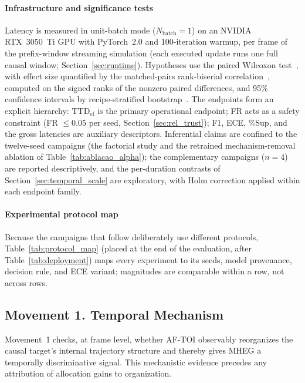\documentclass[a4paper,fleqn]{cas-dc}
\newcommand{\AFTOI}{\mbox{AF-TOI}\xspace}
\newcommand{\MHEG}{\mbox{MHEG}\xspace}
\begin{document}
\paragraph{Infrastructure and significance tests}
Latency is measured in unit-batch mode ($N_{\text{batch}}=1$) on an
NVIDIA RTX~3050~Ti GPU with PyTorch~2.0 and 100-iteration warmup{\color{\revcolor}, per frame of the prefix-window streaming simulation (each executed update runs one full causal window; Section~\ref{sec:runtime})}.
Hypotheses use the paired Wilcoxon test~\cite{wilcoxon1945}, with effect
size quantified by the {\color{\revcolor}matched-pairs rank-biserial
correlation~\cite{kerby2014simple}, computed on the signed ranks of the
nonzero paired differences,} and 95\%
confidence intervals by recipe-stratified
bootstrap~\cite{efron1993introduction}.
{\color{\revcolor}The endpoints form an explicit hierarchy:
$\mathrm{TTD}_{\mathrm{ef}}$ is the primary operational endpoint; FR acts as
a safety constraint (FR $\le 0.05$ per seed, Section~\ref{sec:rel_trust});
F1, ECE, \%Sup, and the gross latencies are auxiliary descriptors.
Inferential claims are confined to the twelve-seed campaigns (the factorial
study and the retrained mechanism-removal ablation of
Table~\ref{tab:ablacao_alpha}); the complementary campaigns ($n{=}4$) are
reported descriptively, and the
per-duration contrasts of Section~\ref{sec:temporal_scale} are exploratory,
with Holm correction applied within each endpoint family.}
{\color{\revcolor}\paragraph{Experimental protocol map}
Because the campaigns that follow deliberately use different protocols,
Table~\ref{tab:protocol_map} (placed at the end of the evaluation, after
Table~\ref{tab:deployment}) maps every experiment to its seeds, model
provenance, decision rule, and ECE variant; magnitudes are comparable within
a row, not across rows.}

\subsection{Movement 1. Temporal Mechanism}
\label{sec:mov1_mecanismo}
Movement~1 checks, at frame level, whether \AFTOI observably reorganizes the
causal target's internal trajectory structure and thereby gives \MHEG a
temporally discriminative signal. This mechanistic evidence precedes any
attribution of allocation gains to organization.
\end{document}
